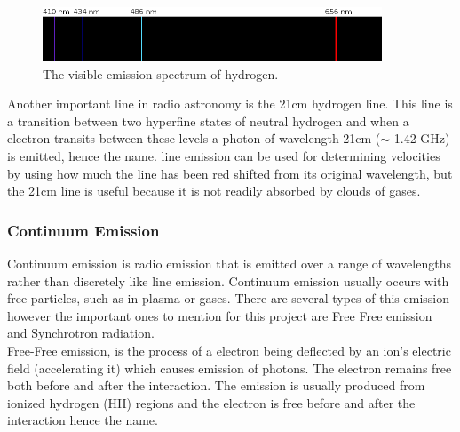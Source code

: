 \documentclass[a4paper, 10pt]{article}
\begin{document}
\begin{figure}[H]
\begin{center}
	\includegraphics[width=0.9\textwidth]{Hspec}
	\caption{The visible emission spectrum of hydrogen\footnotemark.}
	\label{Hspec}
\end{center}
\end{figure}
Another important line in radio astronomy is the 21cm hydrogen line. This line is a transition between two hyperfine states of neutral hydrogen and when a electron transits between these levels a photon of wavelength 21cm ($\sim$ 1.42 GHz) is emitted, hence the name. line emission can be used for determining velocities by using how much the line has been red shifted from its original wavelength, but the 21cm line is useful because it is not readily absorbed by clouds of gases.\\
\subsubsection*{Continuum Emission}
Continuum emission is radio emission that is emitted over a range of wavelengths rather than discretely like line emission. Continuum emission usually occurs with free particles, such as in plasma or gases.  There are several types of this emission however the important ones to mention for this project are Free Free emission and Synchrotron radiation.\\

Free-Free emission, is the process of a electron being deflected by an ion's electric field (accelerating it) which causes emission of photons. The electron remains free both before and after the interaction. The emission is usually produced from ionized hydrogen (HII) regions and the electron is free before and after the interaction hence the name.\\
\end{document}
